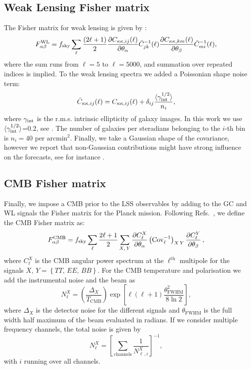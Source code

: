 \documentclass[12pt]{article}
\newcommand{\be}{\begin{equation}}
\newcommand{\ee}{\end{equation}}
\begin{document}
\subsection{Weak Lensing Fisher matrix}
The Fisher matrix for weak lensing is given by \cite{AmendolaRR}:
\be
F_{\alpha\beta}^{\rm WL} = 
f_{\rm sky}\sum_{\ell} \frac{\left(2\ell+1\right)}{2} 
\frac{\partial C_{\kappa\kappa,ij}(\ell) }{\partial \theta_\alpha}\bar{C}_{jk}^{-1}(\ell)
\frac{\partial C_{\kappa\kappa,km}(\ell) }{\partial \theta_\beta}\bar{C}_{mi}^{-1}(\ell),
\ee
where the sum runs from $\ell = 5$ to $\ell = 5000$, and summation over repeated indices is implied. To the weak lensing spectra we added a Poissonian shape noise term:
\be
\bar{C}_{\kappa\kappa,ij}(\ell) = 
C_{\kappa\kappa,ij}(\ell) + \delta_{ij}\frac{\langle \gamma_{\rm int}^{1/2}\rangle}{n_i},
\ee
where $\gamma_{\rm int}$ is the r.m.s. intrinsic ellipticity of galaxy images. In this work we use $\langle\gamma_{\rm int}^{1/2}\rangle$=0.2, see \cite{ZhanUWU}. The number of galaxies per steradians belonging to the $i$-th bin is $n_{i}=40$ per $\text{arcmin}^2$. Finally, we take a Gaussian shape of the covariance, however we report that  non-Gaussian contributions might have strong influence on the forecasts, see for instance \cite{TakadaFN}.




\subsection{CMB Fisher matrix} 

Finally, we impose a CMB prior to the LSS observables by adding to the GC and WL signals the Fisher matrix for the Planck mission. Following Refs.~\cite{knox, jungman, seljak,zaldarriagaXE,kamionkowskiKS}, we define the CMB Fisher matrix as:
\be
F_{\alpha\beta}^{\rm CMB} = f_\text{sky} \sum_\ell\frac{2\ell+1}{2}\sum_{X,\,Y} \frac{\partial C_\ell^{X}}{\partial \theta_\alpha}\left(\text{Cov}_\ell^{-1}\right)_{X\,Y}\frac{\partial C_\ell^{Y}}{\partial \theta_\beta} \,,
\ee
where $C_\ell^{X}$ is the CMB angular power spectrum at the $\ell^\text{th}$ multipole for the signals $X,\,Y = \left\{ TT,\,EE,\,BB\right\}$. For the CMB temperature and polarisation we add the instrumental noise and the beam as \cite{knox} 
\be
N_\ell^X = \left(\frac{\Delta_X}{T_\text{CMB}}\right)\exp\left[\ell(\ell+1)\frac{\theta_\text{FWHM}^2}{8\ln 2}\right],
\ee
where $\Delta_X$ is the detector noise for the different signals and $\theta_\text{FWHM}$ is the full width half maximum of the beam evaluated in radians. If we consider multiple frequency channels, the total noise is given by 
\be
N_\ell^X  = \left[\sum_\text{channels}\frac{1}{N_{\ell\,,i}^{X}}\right]^{-1},
\ee
with $i$ running over all channels. 
\end{document}
